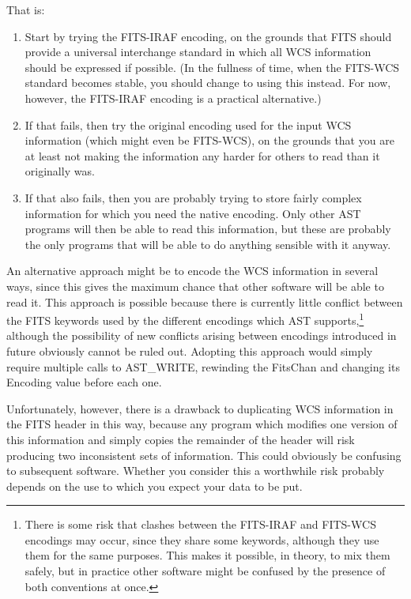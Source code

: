 \documentclass[twoside,11pt]{article}
\begin{document}
That is:

\begin{enumerate}
\item Start by trying the FITS-IRAF encoding, on the grounds that FITS
should provide a universal interchange standard in which all WCS
information should be expressed if possible. (In the fullness of time,
when the FITS-WCS standard becomes stable, you should change to using
this instead. For now, however, the FITS-IRAF encoding is a practical
alternative.)

\item If that fails, then try the original encoding used for the input
WCS information (which might even be FITS-WCS), on the grounds that
you are at least not making the information any harder for others to
read than it originally was.

\item If that also fails, then you are probably trying to store fairly
complex information for which you need the native encoding. Only other
AST programs will then be able to read this information, but these are
probably the only programs that will be able to do anything sensible
with it anyway.
\end{enumerate}

An alternative approach might be to encode the WCS information in
several ways, since this gives the maximum chance that other software
will be able to read it. This approach is possible because there is
currently little conflict between the FITS keywords used by the
different encodings which AST supports,\footnote{There is some risk
that clashes between the FITS-IRAF and FITS-WCS encodings may occur,
since they share some keywords, although they use them for the same
purposes. This makes it possible, in theory, to mix them safely, but
in practice other software might be confused by the presence of both
conventions at once.} although the possibility of new conflicts
arising between encodings introduced in future obviously cannot be
ruled out. Adopting this approach would simply require multiple calls
to AST\_WRITE, rewinding the FitsChan and changing its Encoding value
before each one.

Unfortunately, however, there is a drawback to duplicating WCS
information in the FITS header in this way, because any program which
modifies one version of this information and simply copies the
remainder of the header will risk producing two inconsistent sets of
information. This could obviously be confusing to subsequent
software. Whether you consider this a worthwhile risk probably depends
on the use to which you expect your data to be put.
\end{document}

